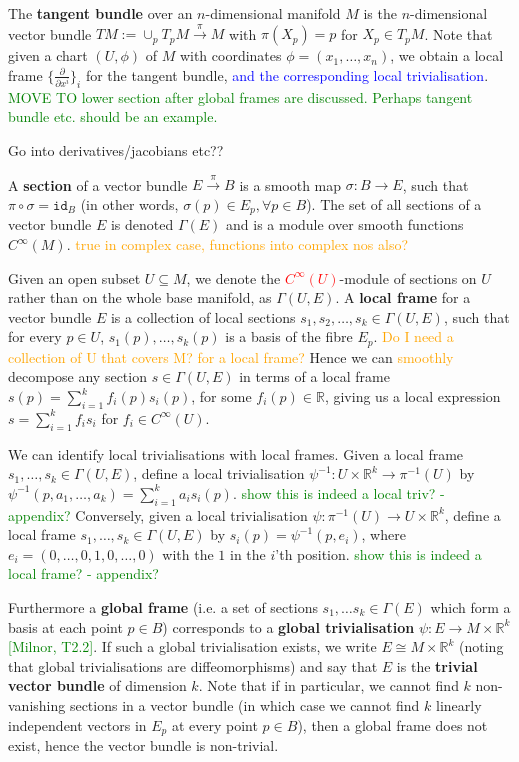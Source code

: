 \documentclass[a4paper]{article}
\theoremstyle{definition} \newtheorem*{definition}{Definition}
\theoremstyle{definition} \newtheorem*{definitions}{Definitions}
\theoremstyle{plain} \newtheorem{theorem}{Theorem}[section]
\theoremstyle{plain} \newtheorem{proposition}[theorem]{Proposition}
\theoremstyle{plain} \newtheorem{corollary}[theorem]{Corollary}
\theoremstyle{plain} \newtheorem{lemma}[theorem]{Lemma}
\theoremstyle{plain} \newtheorem{example}[theorem]{Example}
\newcommand{\checkCorrect}[1]{\textcolor{red}{#1}}
\newcommand{\understandBetter}[1]{\textcolor{orange}{#1}}
\newcommand{\question}[1]{\textcolor{orange}{#1}}
\newcommand{\explainFurther}[1]{\textcolor{blue}{#1}}
\newcommand{\finish}[1]{\textcolor{green}{#1}}
\newcommand{\defn}[1]{\textbf{#1}}
\newcommand{\realnos}{\mathbb{R}}
\newcommand{\id}{\mathtt{id}}
\begin{document}
The \defn{tangent bundle} over an $n$-dimensional manifold $M$ is the $n$-dimensional vector bundle $TM:=\cup_p T_p M\xrightarrow{\pi} M$ with $\pi(X_p)=p$ for $X_p\in T_p M$. Note that given a chart $(U, \phi)$ of $M$ with coordinates $\phi =(x_1, \ldots, x_n)$, we obtain a local frame $\{\frac{\partial}{\partial{x^i}}\}_i$ for the tangent bundle, \explainFurther{and the corresponding local trivialisation}. \finish{MOVE TO lower section after global frames are discussed. Perhaps tangent bundle etc. should be an example.}

Go into derivatives/jacobians etc??

A \defn{section} of a vector bundle $E\xrightarrow{\pi} B$ is a smooth map $\sigma:B\rightarrow E$, such that $\pi \circ \sigma=\id_B$ (in other words, $\sigma(p)\in E_p, \forall p\in B$). The set of all sections of a vector bundle $E$ is denoted $\Gamma (E)$ and is a module over smooth functions $C^\infty(M)$. \question{true in complex case, functions into complex nos also?}

Given an open subset $U\subseteq M$, we denote the \checkCorrect{$C^\infty (U)$}-module of sections on $U$ rather than on the whole base manifold, as $\Gamma (U, E)$. A \defn{local frame} for a vector bundle $E$ is a collection of local sections $s_1, s_2, \ldots, s_k\in \Gamma (U, E)$, such that for every $p\in U$, $s_1(p),\ldots, s_k(p)$ is a basis of the fibre $E_p$. \question{Do I need a collection of U that covers M? for a local frame?} Hence we can \understandBetter{smoothly} decompose any section $s\in \Gamma(U, E)$ in terms of a local frame $s(p)=\sum_{i=1}^k f_i(p)s_i(p)$, for some $f_i(p)\in \realnos$, giving us a local expression $s=\sum_{i=1}^k f_i s_i$ for $f_i\in C^\infty(U)$. 

We can identify local trivialisations with local frames. Given a local frame $s_1, \ldots, s_k\in \Gamma(U, E)$, define a local trivialisation $\psi^{-1}:U\times \realnos^k \to \pi^{-1}(U)$ by
$\psi^{-1}(p, a_1, \ldots, a_k) = \sum_{i=1}^k a_is_i(p)$. \finish{show this is indeed a local triv? - appendix?} Conversely, given a local trivialisation $\psi:\pi^{-1}(U) \to U\times \realnos^k$, define a local frame $s_1,\ldots , s_k\in \Gamma(U, E)$ by $s_i(p)=\psi^{-1} (p, e_i)$, where $e_i = (0, \ldots, 0, 1, 0, \ldots, 0)$ with the $1$ in the $i$'th position. \finish{show this is indeed a local frame? - appendix?}

Furthermore a \defn{global frame} (i.e. a set of sections $s_1, \ldots s_k\in \Gamma(E)$ which form a basis at each point $p\in B$) corresponds to a \defn{global trivialisation} $\psi:E \to M\times \realnos^k$ \finish{[Milnor, T2.2]}. If such a global trivialisation exists, we write $E\cong M\times \realnos^k$ (noting that global trivialisations are diffeomorphisms) and say that $E$ is the \defn{trivial vector bundle} of dimension $k$. 
Note that if in particular, we cannot find $k$ non-vanishing sections in a vector bundle (in which case we cannot find $k$ linearly independent vectors in $E_p$ at every point $p\in B$), then a global frame does not exist, hence the vector bundle is non-trivial.  
\end{document}
